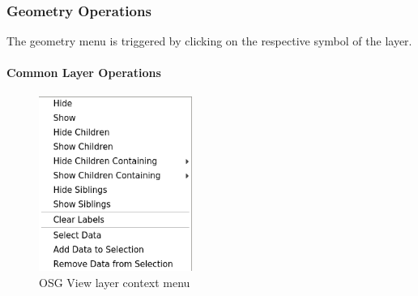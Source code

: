 \subsubsection{Geometry Operations}
\label{sec:geometry_operations}

The geometry menu is triggered by clicking on the respective symbol of the layer.\\

\paragraph{Common Layer Operations}
\begin{figure}[H]
    \includegraphics[width=5cm,frame]{figures/osgview_layer_context_menu.png}
  \caption{OSG View layer context menu}
\end{figure}

